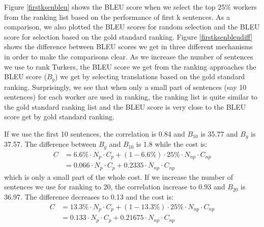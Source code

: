\documentclass[11pt]{article}
\begin{document}




  
  Figure \ref{firstksenbleu}  shows the BLEU score when we select the top 25\% workers from the ranking list based on the performance of first k sentences.
  As a comparison, we also plotted the  BLEU scores for random selection 
  and the BLEU score for selection based on the gold standard ranking.
 Figure \ref{firstksenbleudiff}  shows the difference between BLEU scores we get in three different mechanisms in order to make the comparisons clear.
  As we increase the number of sentences we use to rank Turkers, the BLEU score we get from the ranking approaches the BLEU score ($B_{g}$) we get by selecting translations based on the gold standard ranking. Surprisingly, we see that when only a small part of sentences (say 10 sentences) for each worker are used in ranking, the ranking list  is quite similar to the gold standard ranking list and the BLEU score is very close to the BLEU score get by gold standard ranking.
  
  If we use the first 10 sentences,  the correlation is 0.84 and  $B_{10}$ is 35.77 and $B_{g}$ is 37.57. The difference between $B_{g}$ and $B_{10}$ is 1.8 while the cost is: \\
  \begin{align*}
  C& = 6.6\% \cdot N_{p}\cdot C_{p}  + (1-6.6\% )\cdot 25\% \cdot N_{np} \cdot C_{np}\\
   & = 0.066 \cdot N_{p}\cdot C_{p}  + 0.2335 \cdot N_{np} \cdot C_{np}
  \end{align*}
 which is only a small part of the whole cost. If we increase the number of sentences we use for ranking to 20, the correlation increase to 0.93 and $B_{20}$ is 36.97. The difference decreases to 0.13 and the cost is:
\begin{align*}
C& = 13.3\% \cdot N_{p}\cdot C_{p}  + (1-13.3\% )\cdot 25\% \cdot N_{np} \cdot C_{np}\\
   & = 0.133 \cdot N_{p}\cdot C_{p}  + 0.21675 \cdot N_{np} \cdot C_{np}
\end{align*}
    
\end{document}

